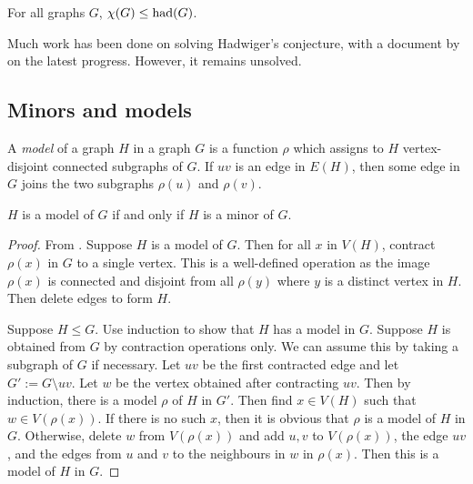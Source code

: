 \begin{conjecture}
	For all graphs \(G\), \(\chi(G) \leq \operatorname{had}(G)\)\cite{hadwigerUeberKlassifikationStreckenkomplexe1943}.
\end{conjecture}
Much work has been done on solving Hadwiger's conjecture, with a document by \textcite{seymourHadwigerConjecture2016} on the latest progress. However, it remains unsolved. 
\subsection{Minors and models}
A \textit{model} of a graph \(H\) in a graph \(G\) is a function $\rho$ which assigns to \(H\) vertex-disjoint connected subgraphs of \(G\). If $uv$ is an edge in \(E(H)\), then some edge in \(G\) joins the two subgraphs \(\rho(u)\) and \(\rho(v)\). 

\begin{theorem}
	\(H\) is a model of \(G\) if and only if $H$ is a minor of $G$.
\end{theorem}

\begin{proof}
	From \textcite{norinMath599GraphMinors2017}. Suppose \(H\) is a model of \(G\). Then for all \(x\) in \(V(H)\), contract \(\rho(x)\) in \(G\) to a single vertex. This is a well-defined operation as the image $\rho(x)$ is connected and disjoint from all $\rho(y)$ where $y$ is a distinct vertex in $H$. Then delete edges to form \(H\).

	Suppose \(H \leq G\). Use induction to show that \(H\) has a model in \(G\). Suppose \(H\) is obtained from \(G\) by contraction operations only. We can assume this by taking a subgraph of \(G\) if necessary. Let \(uv\) be the first contracted edge and let \(G' := G \setminus uv\). Let \(w\) be the vertex obtained after contracting \(uv\). Then by induction, there is a model \(\rho\) of \(H\) in \(G'\). Then find $x \in V(H)$ such that $w \in V(\rho(x))$. If there is no such $x$, then it is obvious that $\rho$ is a model of $H$ in $G$. Otherwise, 
	delete \(w\) from \(V(\rho(x)) \) and add $u, v$ to $V(\rho(x))$, the edge $uv$, and the edges from $u$ and $v$ to the neighbours in $w$ in $\rho(x)$. Then this is a model of \(H\) in \(G\).
\end{proof}

